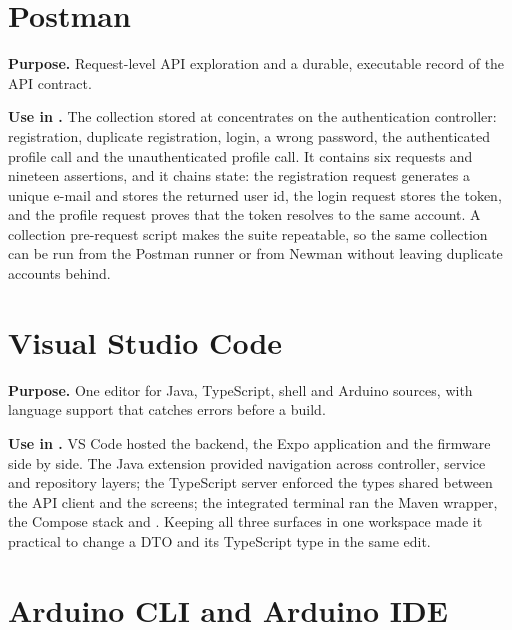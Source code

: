 
\section{Postman}

\textbf{Purpose.} Request-level API exploration and a durable, executable record of
the API contract.

\textbf{Use in \project{}.} The collection stored at
 concentrates on the
authentication controller: registration, duplicate registration, login, a wrong
password, the authenticated profile call and the unauthenticated profile call. It
contains six requests and nineteen assertions, and it chains state: the registration
request generates a unique e-mail and stores the returned user id, the login request
stores the token, and the profile request proves that the token resolves to the same
account. A collection pre-request script makes the suite repeatable, so the same
collection can be run from the Postman runner or from Newman without leaving
duplicate accounts behind.


\section{Visual Studio Code}

\textbf{Purpose.} One editor for Java, TypeScript, shell and Arduino sources, with
language support that catches errors before a build.

\textbf{Use in \project{}.} VS Code hosted the backend, the Expo application and the
firmware side by side. The Java extension provided navigation across controller,
service and repository layers; the TypeScript server enforced the types shared
between the API client and the screens; the integrated terminal ran the Maven
wrapper, the Compose stack and . Keeping all three surfaces in one
workspace made it practical to change a DTO and its TypeScript type in the same
edit.


\section{Arduino CLI and Arduino IDE}

